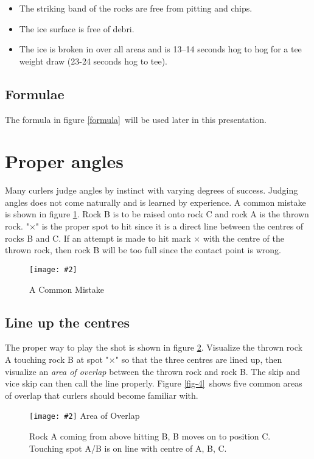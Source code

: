 \documentclass[titlepage,11pt]{article}
\newcommand{\img}[2]{\texttt{[image: \#2]}}
\newcommand{\pict}[4]{%
\begin{figure}[htp]%
    \centering%
	{#4}
    \def\boxX{#3}\ifx\boxX\empty
	\caption{\label{#1} #2}%
    \else
	\caption[#3]{\label{#1} #2}%
    \fi
\end{figure}%
}
\newcommand{\picfileB}[5]{\pict{#1}{#2}{#3}{\img{#4}{#5}}}
\newcommand{\prtfloats}{\clearpage}
\begin{document}
\begin{itemize}
\item The striking band of the rocks are free from pitting and chips.
\item The ice surface is free of debri.
\item The ice is broken in over all areas and is 13--14 seconds hog to hog for a
      tee weight draw (23-24 seconds hog to tee).
\end{itemize}

\subsection*{Formulae}

The formula in figure \ref{formula}\ will be used later in this presentation.

\prtfloats

\section{Proper angles}

Many curlers judge angles by instinct with varying degrees of success. Judging
angles does not come naturally and is learned by experience. A common mistake is
shown in figure \ref{fig-2}. Rock B is to be raised onto rock C and rock A is the thrown
rock. "$\times$" is the proper spot to hit since it is a direct line between the
centres of rocks B and C. If an attempt is made to hit mark $\times$ with the centre of
the thrown rock, then rock B will be too full since the contact point is wrong.

\picfileB{fig-2}{A Common Mistake}{}{width=100mm}{fig02.eps}

\subsection*{Line up the centres}

The proper way to play the shot is shown in figure \ref{fig-3}. Visualize the thrown rock
A touching rock B at spot "$\times$" so that the three centres are lined up, then
visualize an \emph{area of overlap} between the thrown rock and rock B. The skip
and vice skip can then call the line properly. Figure \ref{fig-4}\ shows five common areas
of overlap that curlers should become familiar with.

\picfileB{fig-3}{Rock A coming from above hitting B, B moves on to position C.
Touching spot A/B is on line with centre of A, B, C.}{Area of Overlap}{height=100mm}{fig03.eps}
\end{document}
